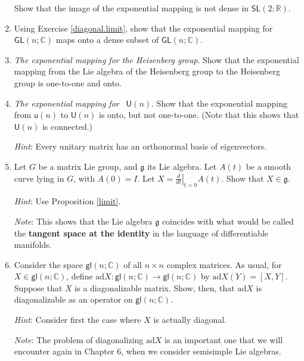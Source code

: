 \documentclass[12pt]{amsbook}
\let \frak = \mathfrak
\theoremstyle{plain}
\numberwithin{equation}{chapter}
\numberwithin{theorem}{chapter}
\begin{document}
\begin{enumerate}
Show that the image of the exponential mapping is not dense in $\mathsf{SL}%
\left(  2;\mathbb{R}\right)  $.

\item  Using Exercise \ref{diagonal.limit}, show that the exponential mapping
for $\mathsf{GL}(n;\mathbb{C})$ maps onto a dense subset of $\mathsf{GL}%
(n;\mathbb{C})$.

\item \label{exp.heisenberg}\textit{The exponential mapping for the Heisenberg
group}. Show that the exponential mapping from the Lie algebra of the
Heisenberg group to the Heisenberg group is one-to-one and onto.

\item \label{exp.un}\textit{The exponential mapping for}\emph{\ }%
$\mathsf{U}(n)$. Show that the exponential mapping from $\mathsf{u}(n)$ to
$\mathsf{U}(n)$ is onto, but not one-to-one. (Note that this shows that
$\mathsf{U}(n)$ is connected.)

\textit{Hint}: Every unitary matrix has an orthonormal basis of eigenvectors.

\item \label{tangent.space}Let $G$ be a matrix Lie group, and $\frak{g}$ its
Lie algebra. Let $A(t)$ be a smooth curve lying in $G$, with $A(0)=I$. Let
$X=\left.  \tfrac{d}{dt}\right|  _{t=0}A(t)$. Show that $X\in\frak{g}$.

\textit{Hint}: Use Proposition \ref{limit}.

\textit{Note}: This shows that the Lie algebra $\frak{g}$ coincides with what
would be called the \textbf{tangent space at the identity} in the language of
differentiable manifolds.

\item \label{ad.diagonal}Consider the space $\mathsf{gl}(n;\mathbb{C})$ of all
$n\times n$ complex matrices. As usual, for $X\in\mathsf{gl}(n;\mathbb{C})$,
define $\mathrm{ad}X:\mathsf{gl}(n;\mathbb{C})\rightarrow\mathsf{gl}%
(n;\mathbb{C})$ by $\mathrm{ad}X(Y)=[X,Y]$. Suppose that $X$ is a
diagonalizable matrix. Show, then, that $\mathrm{ad}X$ is diagonalizable as an
operator on $\mathsf{gl}(n;\mathbb{C})$.

\textit{Hint}: Consider first the case where $X$ is actually diagonal.

\textit{Note}: The problem of diagonalizing $\mathrm{ad}X$ is an important one
that we will encounter again in Chapter 6, when we consider semisimple Lie algebras.
\end{enumerate}
\end{document}
